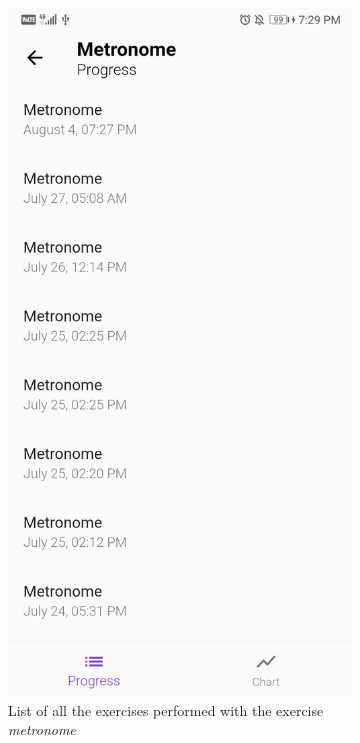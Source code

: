 \begin{appendices}
\begin{landscape}
\begin{figure}[h]
\begin{subfigure}{.25\textwidth}
    \includegraphics[width=.75\linewidth]{content/imgs/screen7.jpg}
    \caption{List of all the exercises performed with the exercise \textit{metronome}}
  \end{subfigure}%
  \begin{subfigure}{.25\textwidth}
    \centering

\end{subfigure}
\end{figure}
\end{landscape}
\end{appendices}
